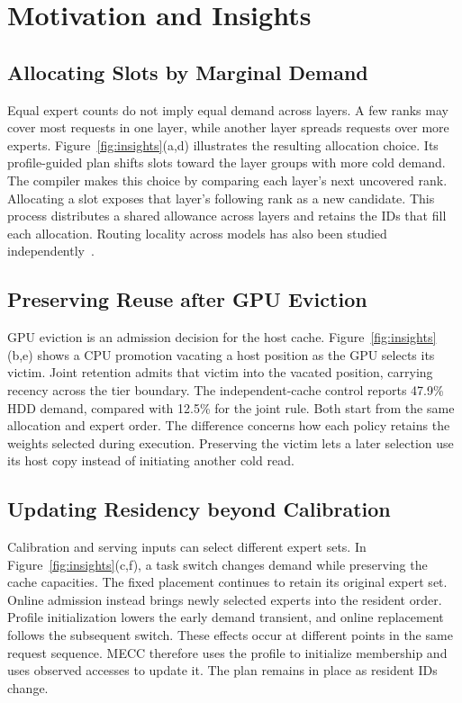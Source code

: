 \documentclass[conference,9pt,letterpaper]{IEEEtran}
\begin{document}
\section{Motivation and Insights}
\label{sec:challenges}
\subsection{Allocating Slots by Marginal Demand}
Equal expert counts do not imply equal demand across layers. A few ranks may cover most requests in one layer, while another layer spreads requests over more experts. Figure~\ref{fig:insights}(a,d) illustrates the resulting allocation choice. Its profile-guided plan shifts slots toward the layer groups with more cold demand. The compiler makes this choice by comparing each layer's next uncovered rank. Allocating a slot exposes that layer's following rank as a new candidate. This process distributes a shared allowance across layers and retains the IDs that fill each allocation. Routing locality across models has also been studied independently~\cite{routingconsistency}.

\subsection{Preserving Reuse after GPU Eviction}
GPU eviction is an admission decision for the host cache. Figure~\ref{fig:insights}(b,e) shows a CPU promotion vacating a host position as the GPU selects its victim. Joint retention admits that victim into the vacated position, carrying recency across the tier boundary. The independent-cache control reports 47.9\% HDD demand, compared with 12.5\% for the joint rule. Both start from the same allocation and expert order. The difference concerns how each policy retains the weights selected during execution. Preserving the victim lets a later selection use its host copy instead of initiating another cold read.

\subsection{Updating Residency beyond Calibration}
Calibration and serving inputs can select different expert sets. In Figure~\ref{fig:insights}(c,f), a task switch changes demand while preserving the cache capacities. The fixed placement continues to retain its original expert set. Online admission instead brings newly selected experts into the resident order. Profile initialization lowers the early demand transient, and online replacement follows the subsequent switch. These effects occur at different points in the same request sequence. MECC therefore uses the profile to initialize membership and uses observed accesses to update it. The plan remains in place as resident IDs change.
\end{document}
